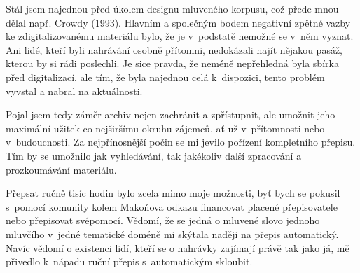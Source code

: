 Stál jsem najednou před úkolem designu mluveného korpusu, což přede mnou dělal
např. Crowdy (1993)\cite{crowdy1993spoken}.
Hlavním a společným bodem negativní zpětné vazby ke zdigitalizovanému materiálu
bylo, že je v~podstatě nemožné se v~něm vyznat. Ani lidé, kteří byli nahrávání
osobně přítomni, nedokázali najít nějakou pasáž, kterou by si rádi poslechli. Je
sice pravda, že neméně nepřehledná byla sbírka před digitalizací, ale tím, že
byla najednou celá k~dispozici, tento problém vyvstal a nabral na aktuálnosti.

Pojal jsem tedy záměr archiv nejen zachránit a zpřístupnit, ale umožnit jeho
maximální užitek co nejširšímu okruhu zájemců, ať už v~přítomnosti nebo
v~budoucnosti. Za nejpřínosnější počin se mi jevilo pořízení kompletního
přepisu. Tím by se umožnilo jak vyhledávání, tak jakékoliv další zpracování a
prozkoumávání materiálu.

Přepsat ručně tisíc hodin bylo zcela mimo moje možnosti, byť bych se pokusil
s~pomocí komunity kolem Makoňova odkazu financovat placené přepisovatele nebo
přepisovat svépomocí. Vědomí, že se jedná o mluvené slovo jednoho mluvčího
v~jedné tematické doméně mi skýtala naději na přepis automatický. Navíc vědomí o
existenci lidí, kteří se o nahrávky zajímají právě tak jako já, mě přivedlo
k~nápadu ruční přepis s~automatickým skloubit.

